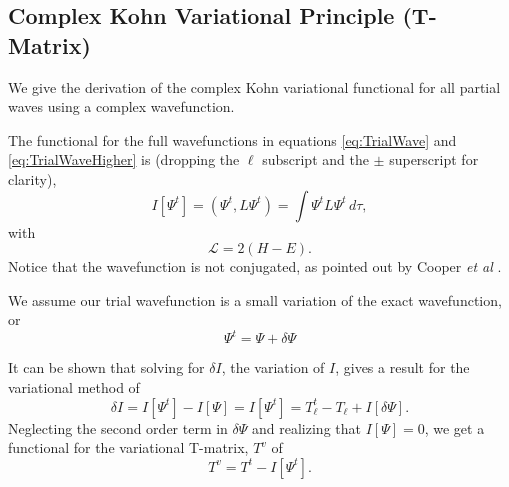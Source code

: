 \documentclass[preprint,showpacs,preprintnumbers,amsmath,amssymb]{revtex4}
\newcommand{\beq}{\begin{equation}}
\newcommand{\eeq}{\end{equation}}
\begin{document}
\subsection{Complex Kohn Variational Principle (T-Matrix)}
\label{sec:ComplexKohn}

 We give the derivation of the complex Kohn variational functional for all partial waves using a complex wavefunction.

The functional for the full wavefunctions in equations \ref{eq:TrialWave} and \ref{eq:TrialWaveHigher} is (dropping the $\ell$ subscript and the $\pm$ superscript for clarity),
\begin{equation}
I[\Psi^t] = \left(\Psi^t, L \Psi^t \right) = \int \Psi^t L \Psi^t \,d\tau,
\label{eq:IlDefPsi}
\end{equation}
with
\beq
\mathcal{L} = 2(H - E).
\label{eq:LDef}
\eeq
Notice that the wavefunction is not conjugated, as pointed out by Cooper \emph{et al} \cite{Cooper2010}.

We assume our trial wavefunction is a small variation of the exact wavefunction, or
\beq
\Psi^t = \Psi + \delta \Psi
\label{eq:PsiTrialRelation}
\eeq

It can be shown that solving for $\delta I$, the variation of $I$, gives a result for the variational method of
\beq
\delta I = I[\Psi^t] - I[\Psi] = I[\Psi^t] = T_\ell^t - T_\ell + I[\delta \Psi].
\label{eq:IlPsiVariation}
\eeq
Neglecting the second order term in $\delta \Psi$ and realizing that $I[\Psi] = 0$, we get a functional for the variational T-matrix, $T^v$ of
\beq
T^v = T^t - I[\Psi^t].
\label{eq:ComplexKohnVariation}
\eeq
\end{document}
